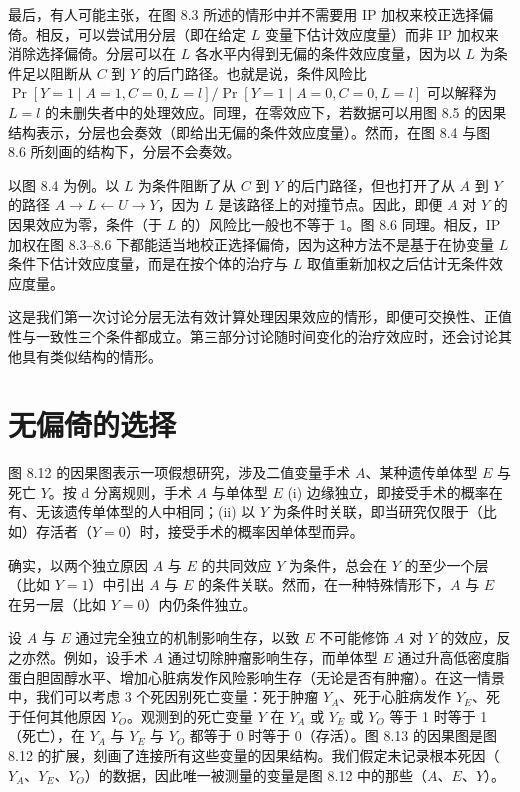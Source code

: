 最后，有人可能主张，在图 8.3 所述的情形中并不需要用 IP 加权来校正选择偏倚。相反，可以尝试用分层（即在给定 $L$ 变量下估计效应度量）而非 IP 加权来消除选择偏倚。分层可以在 $L$ 各水平内得到无偏的条件效应度量，因为以 $L$ 为条件足以阻断从 $C$ 到 $Y$ 的后门路径。也就是说，条件风险比 $\Pr[Y=1\mid A=1,C=0,L=l]/\Pr[Y=1\mid A=0,C=0,L=l]$ 可以解释为 $L=l$ 的未删失者中的处理效应。同理，在零效应下，若数据可以用图 8.5 的因果结构表示，分层也会奏效（即给出无偏的条件效应度量）。然而，在图 8.4 与图 8.6 所刻画的结构下，分层不会奏效。

以图 8.4 为例。以 $L$ 为条件阻断了从 $C$ 到 $Y$ 的后门路径，但也打开了从 $A$ 到 $Y$ 的路径 $A\to L\leftarrow U\to Y$，因为 $L$ 是该路径上的对撞节点。因此，即便 $A$ 对 $Y$ 的因果效应为零，条件（于 $L$ 的）风险比一般也不等于 1。图 8.6 同理。相反，IP 加权在图 8.3–8.6 下都能适当地校正选择偏倚，因为这种方法不是基于在协变量 $L$ 条件下估计效应度量，而是在按个体的治疗与 $L$ 取值重新加权之后估计无条件效应度量。

这是我们第一次讨论分层无法有效计算处理因果效应的情形，即便可交换性、正值性与一致性三个条件都成立。第三部分讨论随时间变化的治疗效应时，还会讨论其他具有类似结构的情形。

\section{无偏倚的选择}

图 8.12 的因果图表示一项假想研究，涉及二值变量手术 $A$、某种遗传单体型 $E$ 与死亡 $Y$。按 d 分离规则，手术 $A$ 与单体型 $E$ (i) 边缘独立，即接受手术的概率在有、无该遗传单体型的人中相同；(ii) 以 $Y$ 为条件时关联，即当研究仅限于（比如）存活者（$Y=0$）时，接受手术的概率因单体型而异。

\begin{figure}[htbp]
\centering
{}
\caption{}
\label{fig:8.12}
\end{figure}

确实，以两个独立原因 $A$ 与 $E$ 的共同效应 $Y$ 为条件，总会在 $Y$ 的至少一个层（比如 $Y=1$）中引出 $A$ 与 $E$ 的条件关联。然而，在一种特殊情形下，$A$ 与 $E$ 在另一层（比如 $Y=0$）内仍条件独立。

设 $A$ 与 $E$ 通过完全独立的机制影响生存，以致 $E$ 不可能修饰 $A$ 对 $Y$ 的效应，反之亦然。例如，设手术 $A$ 通过切除肿瘤影响生存，而单体型 $E$ 通过升高低密度脂蛋白胆固醇水平、增加心脏病发作风险影响生存（无论是否有肿瘤）。在这一情景中，我们可以考虑 3 个死因别死亡变量：死于肿瘤 $Y_A$、死于心脏病发作 $Y_E$、死于任何其他原因 $Y_O$。观测到的死亡变量 $Y$ 在 $Y_A$ 或 $Y_E$ 或 $Y_O$ 等于 1 时等于 1（死亡），在 $Y_A$ 与 $Y_E$ 与 $Y_O$ 都等于 0 时等于 0（存活）。图 8.13 的因果图是图 8.12 的扩展，刻画了连接所有这些变量的因果结构。我们假定未记录根本死因（$Y_A$、$Y_E$、$Y_O$）的数据，因此唯一被测量的变量是图 8.12 中的那些（$A$、$E$、$Y$）。

